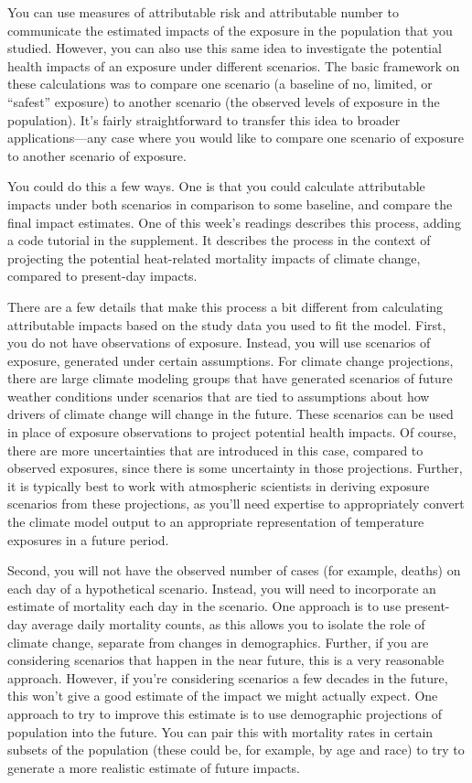 \documentclass[
]{book}
\begin{document}
You can use measures of attributable risk and attributable number to communicate the estimated impacts of the exposure in the population that you studied. However, you can also use this same idea to investigate the potential health impacts of an exposure under different scenarios. The basic framework on these calculations was to compare one scenario (a baseline of no, limited, or ``safest'' exposure) to another scenario (the observed levels of exposure in the population). It's fairly straightforward to transfer this idea to broader applications---any case where you would like to compare one scenario of exposure to another scenario of exposure.

You could do this a few ways. One is that you could calculate attributable impacts under both scenarios in comparison to some baseline, and compare the final impact estimates. One of this week's readings \citep{vicedo2019hands} describes this process, adding a code tutorial in the supplement. It describes the process in the context of projecting the potential heat-related mortality impacts of climate change, compared to present-day impacts.

There are a few details that make this process a bit different from calculating attributable impacts based on the study data you used to fit the model. First, you do not have observations of exposure. Instead, you will use scenarios of exposure, generated under certain assumptions. For climate change projections, there are large climate modeling groups that have generated scenarios of future weather conditions under scenarios that are tied to assumptions about how drivers of climate change will change in the future. These scenarios can be used in place of exposure observations to project potential health impacts. Of course, there are more uncertainties that are introduced in this case, compared to observed exposures, since there is some uncertainty in those projections. Further, it is typically best to work with atmospheric scientists in deriving exposure scenarios from these projections, as you'll need expertise to appropriately convert the climate model output to an appropriate representation of temperature exposures in a future period.

Second, you will not have the observed number of cases (for example, deaths) on each day of a hypothetical scenario. Instead, you will need to incorporate an estimate of mortality each day in the scenario. One approach is to use present-day average daily mortality counts, as this allows you to isolate the role of climate change, separate from changes in demographics. Further, if you are considering scenarios that happen in the near future, this is a very reasonable approach. However, if you're considering scenarios a few decades in the future, this won't give a good estimate of the impact we might actually expect. One approach to try to improve this estimate is to use demographic projections of population into the future. You can pair this with mortality rates in certain subsets of the population (these could be, for example, by age and race) to try to generate a more realistic estimate of future impacts.
\end{document}
